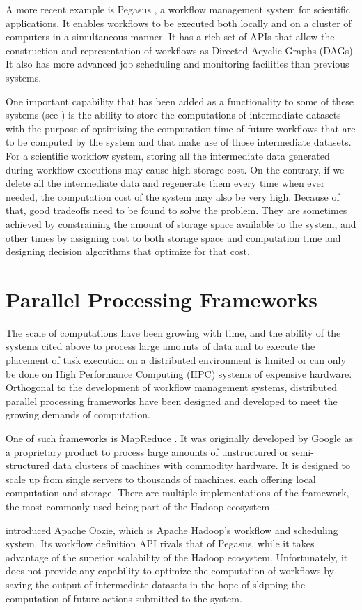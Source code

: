 A more recent example is Pegasus \citep{singh2008workflow}, a workflow management system for scientific applications.  It enables workflows to be executed both locally and on a cluster of computers in a simultaneous manner.  It has a rich set of APIs that allow the construction and representation of workflows as Directed Acyclic Graphs (DAGs).  It also has more advanced job scheduling and monitoring facilities than previous systems.  

One important capability that has been added as a functionality to some of these systems (see \cite{yuan2012data}) is the ability to store the computations of intermediate datasets with the purpose of optimizing the computation time of future workflows that are to be computed by the system and that make use of those intermediate datasets. For a scientific workflow system, storing all the intermediate data generated during workflow executions may cause high storage cost.  On the contrary, if we delete all the intermediate data and regenerate them every time when ever needed, the computation cost of the system may also be very high. Because of that, good tradeoffs need to be found to solve the problem.  They are sometimes achieved by constraining the amount of storage space available to the system, and other times by assigning cost to both storage space and computation time and designing decision algorithms that optimize for that cost. 

\section{Parallel Processing Frameworks}

The scale of computations have been growing with time, and the ability of the systems cited above to process large amounts of data and to execute the placement of task execution on a distributed environment is limited or can only be done on High Performance Computing (HPC) systems of expensive hardware.  Orthogonal to the development of workflow management systems, distributed parallel processing frameworks have been designed and developed to meet the growing demands of computation.  

One of such frameworks is MapReduce \citep{dean2008mapreduce}. It was originally developed by Google as a proprietary product to process large amounts of unstructured or semi-structured data clusters of machines with commodity hardware. It is designed to scale up from single servers to thousands of machines, each offering local computation and storage. There are multiple implementations of the framework, the most commonly used being part of the Hadoop ecosystem \citep{white2012hadoop}.

\cite{islam2012oozie} introduced Apache Oozie, which is Apache Hadoop's workflow and scheduling system.  Its workflow definition API rivals that of Pegasus, while it takes advantage of the superior scalability of the Hadoop ecosystem. Unfortunately, it does not provide any capability to optimize the computation of workflows by saving the output of intermediate datasets in the hope of skipping the computation of future actions submitted to the system.